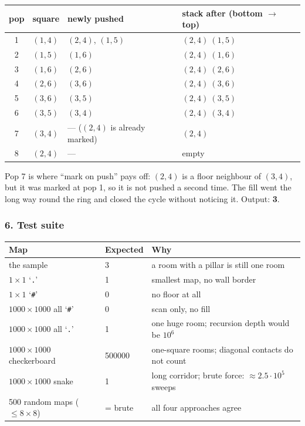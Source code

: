 \begin{tracebox}
\begin{center}
\small
\begin{tabular}{@{}clll@{}}
\toprule
\textbf{pop} & \textbf{square} & \textbf{newly pushed} & \textbf{stack after (bottom $\to$ top)} \\
\midrule
1 & $(1,4)$ & $(2,4)$, $(1,5)$ & $(2,4)\ (1,5)$ \\
2 & $(1,5)$ & $(1,6)$ & $(2,4)\ (1,6)$ \\
3 & $(1,6)$ & $(2,6)$ & $(2,4)\ (2,6)$ \\
4 & $(2,6)$ & $(3,6)$ & $(2,4)\ (3,6)$ \\
5 & $(3,6)$ & $(3,5)$ & $(2,4)\ (3,5)$ \\
6 & $(3,5)$ & $(3,4)$ & $(2,4)\ (3,4)$ \\
7 & $(3,4)$ & --- ($(2,4)$ is already marked) & $(2,4)$ \\
8 & $(2,4)$ & --- & empty \\
\bottomrule
\end{tabular}
\end{center}
Pop 7 is where ``mark on push'' pays off: $(2,4)$ is a floor neighbour of $(3,4)$, but it was marked at pop 1, so it is not pushed a second time. The fill went the long way round the ring and closed the cycle without noticing it. Output: \textbf{3}.
\end{tracebox}

\subsubsection*{6. Test suite}

\begin{testbox}
\centering\small
\begin{tabular}{@{}lll@{}}
\toprule
\textbf{Map} & \textbf{Expected} & \textbf{Why} \\
\midrule
the sample & 3 & a room with a pillar is still one room \\
$1\times1$ `\texttt{.}' & 1 & smallest map, no wall border \\
$1\times1$ `\texttt{\#}' & 0 & no floor at all \\
$1000\times1000$ all `\texttt{\#}' & 0 & scan only, no fill \\
$1000\times1000$ all `\texttt{.}' & 1 & one huge room; recursion depth would be $10^6$ \\
$1000\times1000$ checkerboard & 500000 & one-square rooms; diagonal contacts do not count \\
$1000\times1000$ snake & 1 & long corridor; brute force: $\approx 2.5\cdot10^5$ sweeps \\
500 random maps ($\le 8\times8$) & = brute & all four approaches agree \\
\bottomrule
\end{tabular}
\end{testbox}


